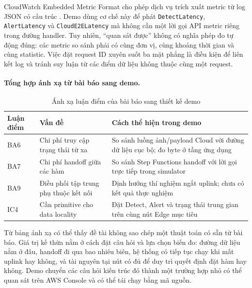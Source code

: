 CloudWatch Embedded Metric Format cho phép dịch vụ trích xuất metric từ log JSON
có cấu trúc \cite{awsCloudWatchEMF}. Demo dùng cơ chế này để phát
\texttt{DetectLatency}, \texttt{AlertLatency} và \texttt{CloudE2ELatency} mà không
cần một lời gọi API metric riêng trong đường handler. Tuy nhiên, ``quan sát được''
không có nghĩa phép đo tự động đúng: các metric so sánh phải có cùng đơn vị, cùng
khoảng thời gian và cùng statistic. Việc đặt request ID xuyên suốt ba mặt phẳng là
điều kiện để liên kết log và tránh suy luận từ các điểm dữ liệu không thuộc cùng
một request.

\paragraph{Tổng hợp ánh xạ từ bài báo sang demo.}

\begin{table}[htbp]
    \centering
    \caption{Ánh xạ luận điểm của bài báo sang thiết kế demo}
    \label{tab:paper-mapping}
    \begin{tabular}{|p{2cm}|p{5cm}|p{7cm}|}
        \hline
        \textbf{Luận điểm} & \textbf{Vấn đề} & \textbf{Cách thể hiện trong demo} \\ \hline
        BA6 & Chi phí truy cập trạng thái từ xa & So sánh luồng ảnh/payload Cloud
        với đường dữ liệu cục bộ; đo byte ở tầng ứng dụng \\ \hline
        BA7 & Chi phí handoff giữa các hàm & So sánh Step Functions handoff với
        lời gọi trực tiếp trong simulator \\ \hline
        BA9 & Điều phối tập trung phụ thuộc kết nối & Định hướng thí nghiệm ngắt
        uplink; chưa có kết quả thực nghiệm \\ \hline
        IC4 & Cần primitive cho data locality & Đặt Detect, Alert và trạng thái
        trung gian trên cùng nút Edge mục tiêu \\ \hline
    \end{tabular}
\end{table}

Từ bảng ánh xạ có thể thấy đề tài không sao chép một thuật toán có sẵn từ bài báo.
Giá trị kế thừa nằm ở cách đặt câu hỏi và lựa chọn biến đo: đường dữ liệu nằm ở
đâu, handoff đi qua bao nhiêu biên, hệ thống có tiếp tục chạy khi mất uplink hay
không, và tài nguyên tại nút có đủ để duy trì quyết định đặt hàm hay không. Demo
chuyển các câu hỏi kiến trúc đó thành một trường hợp nhỏ có thể quan sát trên AWS
Console và có thể tái chạy bằng mã nguồn.


